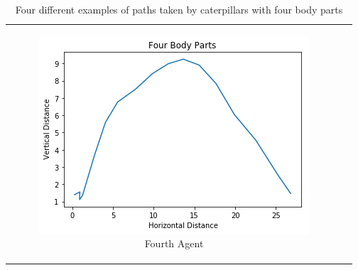 \documentclass[12pt,oneside,listof=totoc,paper=a4,headings=small]{scrbook}
\begin{document}
{\begin{table}[ht]
\begin{tabular}{cc}
\begin{subfigure}{0.4\textwidth}\centering\includegraphics[width=0.75\columnwidth]{images/fourparts4.png}\caption{Fourth Agent}\label{fig:fourplotpartsd}\end{subfigure}\\
\end{tabular}
\caption{Four different examples of paths taken by caterpillars with four body parts}
\label{tab:fourplotparts}
\end{table}
}
\end{document}
